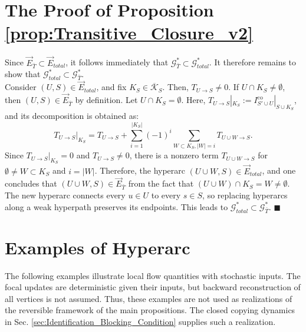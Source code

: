 \documentclass{comnet}%
\begin{document}
\section{\label{app:Proof_Transitive_v2} The Proof of Proposition \ref{prop:Transitive_Closure_v2}}
Since $\overrightarrow{E}_{\bar{T}} \subset \overrightarrow{E}_{total}$, it follows immediately that $\mathcal{G}_{\bar{T}}^{*} \subset \mathcal{G}_{total}^{*}$. It therefore remains to show that $\mathcal{G}_{total}^{*} \subset \mathcal{G}_{\bar{T}}^{*}$.\\ 
Consider $(U, S) \in \overrightarrow{E}_{total}$, and fix $K_{S} \in \overline{\mathcal{K}}_{S}$. Then, $T_{U \to S} \not= 0$. If $U \cap K_{S} \not= \emptyset$, then $(U, S) \in \overrightarrow{E}_{\bar{T}}$ by definition. Let $U \cap K_{S} = \emptyset$. Here, $T_{U\to S}|_{K_S}:=I^{\text{co}}_{S'\cup U}|_{S\cup K_S}$, and its decomposition is obtained as:
\begin{equation}
	T_{U \to S}|_{K_{S}} = T_{U \to S} + \sum_{i=1}^{|K_{S}|} (-1)^{i}\sum_{W \subset K_{S}, |W|=i} T_{U \cup W \to S}.
\end{equation}
Since $T_{U \to S}|_{K_{S}} = 0$ and $T_{U \to S} \not= 0$, there is a nonzero term $T_{U \cup W \to S}$ for $\emptyset \not= W \subset K_{S}$ and $i = |W|$. Therefore, the hyperarc $(U \cup W, S) \in \overrightarrow{E}_{total}$, and one concludes that $(U \cup W, S) \in \overrightarrow{E}_{\bar{T}}$ from the fact that $(U \cup W) \cap K_{S} = W \not= \emptyset$. The new hyperarc connects every $u\in U$ to every $s\in S$, so replacing hyperarcs along a weak hyperpath preserves its endpoints. This leads to $\mathcal{G}_{total}^{*} \subset \mathcal{G}_{\bar{T}}^{*}$. $\blacksquare$

\section{\label{app:Identification_Examples}Examples of Hyperarc}
The following examples illustrate local flow quantities with stochastic inputs. The focal updates are deterministic given their inputs, but backward reconstruction of all vertices is not assumed. Thus, these examples are not used as realizations of the reversible framework of the main propositions. The closed copying dynamics in Sec. \ref{sec:Identification_Blocking_Condition} supplies such a realization.\\
\end{document}
